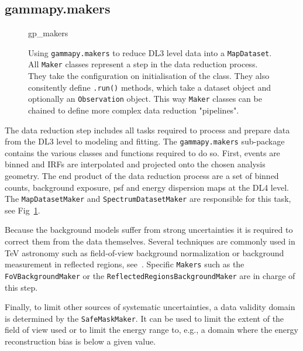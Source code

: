 \documentclass[traditabstract, longauth]{aa}
\newcommand{\code}[1]{\texttt{#1}}
\begin{document}
\subsection{gammapy.makers}
\label{ssec:gammapy-makers}
%
\begin{figure}
    {gp_makers}
	\caption{
        Using \code{gammapy.makers} to reduce DL3 level data into a
		\code{MapDataset}. All \code{Maker} classes represent 
		a step in the data reduction process. They take
        the configuration on initialisation of the class. They 
		also consitently define \code{.run()} methods, which take 
		a dataset object and optionally an \code{Observation} 
		object. This way \code{Maker} classes can be chained
		to define more complex data reduction "pipelines".
    }
	\label{ig*:minted:gp_makers}
\end{figure}
%
The data reduction step includes all tasks required to process and prepare
\gammaray data from the DL3 level to modeling and fitting. The \code{gammapy.makers} sub-package
contains the various classes and functions required to do so. First, events are
binned and IRFs are interpolated and projected onto the chosen analysis
geometry. The end product of the data reduction process are a set of binned counts,
background exposure, psf and energy dispersion maps at the DL4 level. 
The \code{MapDatasetMaker} and \code{SpectrumDatasetMaker} are
responsible for this task, see Fig~\ref{ig*:minted:gp_makers}.

Because the background models suffer from strong uncertainties it is required
to correct them from the data themselves. Several techniques are commonly used
in TeV \gammaray astronomy such as field-of-view background normalization or
background measurement in reflected regions, see~\cite{Berge07}.
Specific \code{Makers} such as the \code{FoVBackgroundMaker} or the
\code{ReflectedRegionsBackgroundMaker} are in charge of this step.

Finally, to limit other sources of systematic uncertainties, a data validity
domain is determined by the \code{SafeMaskMaker}. It can be used to limit the
extent of the field of view used or to limit the energy range to, e.g., a domain
where the energy reconstruction bias is below a given value.
\end{document}
